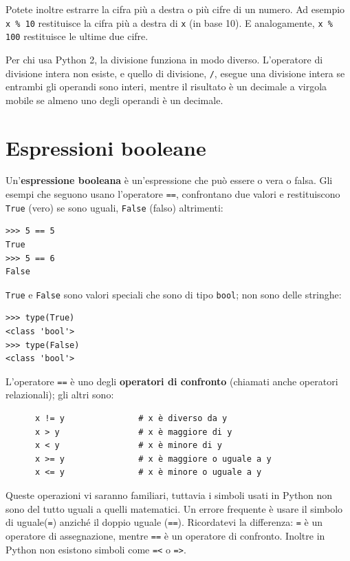 \documentclass[10pt]{book}
\begin{document}
Potete inoltre estrarre la cifra più a destra o più cifre di un numero. Ad esempio {\tt x \% 10} restituisce la cifra più a destra di {\tt x} (in base 10). E analogamente, {\tt x \% 100} restituisce le ultime due cifre.

Per chi usa Python 2, la divisione funziona in modo diverso. L'operatore di divisione intera non esiste, e quello di divisione, \verb"/", esegue una divisione intera se entrambi gli operandi sono interi, mentre il risultato è un decimale a virgola mobile se almeno uno degli operandi è un decimale.


\section{Espressioni booleane}

Un'{\bf espressione booleana} è un'espressione che può essere o vera o falsa.  Gli esempi che seguono usano l'operatore {\tt ==}, confrontano due valori e restituiscono {\tt True} (vero) se sono uguali, {\tt False} (falso) altrimenti:

\begin{verbatim}
>>> 5 == 5
True
>>> 5 == 6
False
\end{verbatim}
%
{\tt True} e {\tt False} sono valori speciali che sono di tipo {\tt bool}; non sono delle stringhe:

\begin{verbatim}
>>> type(True)
<class 'bool'>
>>> type(False)
<class 'bool'>
\end{verbatim}
%
L'operatore {\tt ==} è uno degli {\bf operatori di confronto} (chiamati anche operatori relazionali); gli altri sono:

\begin{verbatim}
      x != y               # x è diverso da y
      x > y                # x è maggiore di y
      x < y                # x è minore di y
      x >= y               # x è maggiore o uguale a y
      x <= y               # x è minore o uguale a y
\end{verbatim}
%
Queste operazioni vi saranno familiari, tuttavia i simboli usati in Python non sono del tutto uguali a quelli matematici. Un errore frequente è usare il simbolo di uguale({\tt =}) anziché il doppio uguale ({\tt ==}). Ricordatevi la differenza: {\tt =} è un operatore di assegnazione, mentre {\tt ==} è un operatore di confronto. Inoltre in Python non esistono simboli come {\tt =<} o {\tt =>}.
\end{document}

